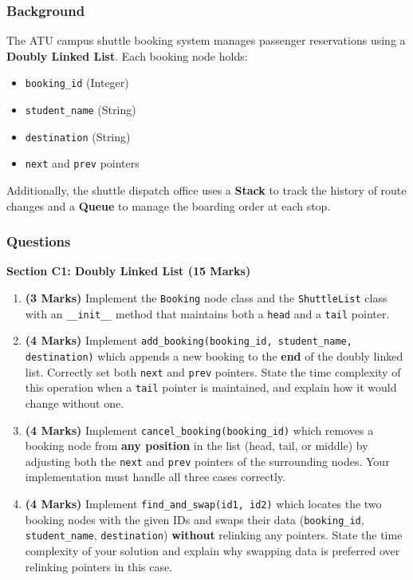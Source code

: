 \documentclass[11pt,a4paper]{article}
\begin{document}
\subsubsection*{Background}
The ATU campus shuttle booking system manages passenger reservations using a \textbf{Doubly Linked List}. Each booking node holds:
\begin{itemize}
    \item \texttt{booking\_id} (Integer)
    \item \texttt{student\_name} (String)
    \item \texttt{destination} (String)
    \item \texttt{next} and \texttt{prev} pointers
\end{itemize}

Additionally, the shuttle dispatch office uses a \textbf{Stack} to track the history of route changes and a \textbf{Queue} to manage the boarding order at each stop.

\subsubsection*{Questions}

\textbf{Section C1: Doubly Linked List (15 Marks)}

\begin{enumerate}[label=\textbf{C\arabic*.}]
    \item \textbf{(3 Marks)} Implement the \texttt{Booking} node class and the \texttt{ShuttleList} class with an \texttt{\_\_init\_\_} method that maintains both a \texttt{head} and a \texttt{tail} pointer.

    \item \textbf{(4 Marks)} Implement \texttt{add\_booking(booking\_id, student\_name, destination)} which appends a new booking to the \textbf{end} of the doubly linked list. Correctly set both \texttt{next} and \texttt{prev} pointers. State the time complexity of this operation when a \texttt{tail} pointer is maintained, and explain how it would change without one.

    \item \textbf{(4 Marks)} Implement \texttt{cancel\_booking(booking\_id)} which removes a booking node from \textbf{any position} in the list (head, tail, or middle) by adjusting both the \texttt{next} and \texttt{prev} pointers of the surrounding nodes. Your implementation must handle all three cases correctly.

    \item \textbf{(4 Marks)} Implement \texttt{find\_and\_swap(id1, id2)} which locates the two booking nodes with the given IDs and swaps their data (\texttt{booking\_id}, \texttt{student\_name}, \texttt{destination}) \textbf{without} relinking any pointers. State the time complexity of your solution and explain why swapping data is preferred over relinking pointers in this case.
\end{enumerate}
\end{document}
